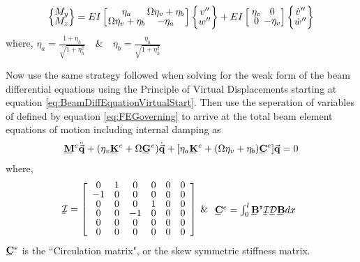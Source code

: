 \begin{equation}\label{key}
\def\cs{4em}
\def\cd{1.5em}
\left\{\def\arraystretch{.8}\begin{array}{@{}c@{}}
M_y\\
M_z
\end{array}\right\} = E I\left[\def\arraystretch{.8}\arraycolsep=0em\begin{array}{@{}cc@{}}
\makebox[\cs]{$\eta_a$}&\makebox[\cs]{$\Omega \eta_v+\eta_b$}\\
\Omega \eta_v+\eta_b&-\eta_a
\end{array}\right]\left\{\arraycolsep=0pt\def\arraystretch{.8}\begin{array}{@{}c@{}}
v''\\
w''
\end{array}\right\}+EI\left[\arraycolsep=0pt\def\arraystretch{.8}\begin{array}{@{}cc@{}}
\makebox[\cd]{$\eta_v$}&\makebox[\cd]{0}\\
0&-\eta_v
\end{array}\right]\left\{\arraycolsep=0pt\def\arraystretch{.8}\begin{array}{@{}c@{}}
\dot{v}''\\
\dot{w}''
\end{array}\right\}
\end{equation}
where, $ \eta_a=\frac{1+\eta_h}{\sqrt{1+\eta_h^2}}\quad \& \quad \eta_b=\frac{\eta_h}{\sqrt{1+\eta_h^2}} $\par 
Now use the same strategy followed when solving for the weak form of the beam differential equations using the Principle of Virtual Displacements starting at equation \eqref{eq:BeamDiffEquationVirtualStart}. Then use the seperation of variables of defined by equation \eqref{eq:FEGoverning} to arrive at the total beam element equations of motion including internal damping as
\begin{equation}\label{eq:TotalBeamFiniteElementEquationofMotion}
\bunderline{\mathbf{M}}^e\ddot{\vec{\mathbf{q}}}+(\eta_v\bunderline{\mathbf{K}}^e+\Omega\bunderline{\mathbf{G}}^e)\dot{\vec{\mathbf{q}}}+[\eta_a\bunderline{\mathbf{K}}^e+(\Omega\eta_v+\eta_b)\bunderline{\mathbf{C}}^e]\vec{\mathbf{q}}=0
\end{equation}
where,
\begin{equation}\label{key}
\bunderline{\mathcal{I}}=\left[\def\arraystretch{.8}\begin{array}{cccccc}
0&1&0&0&0&0\\
-1&0&0&0&0&0\\
0&0&0&1&0&0\\
0&0&-1&0&0&0\\
0&0&0&0&0&0\\
0&0&0&0&0&0
\end{array}\right]\:\&\:\begin{array}{c}
\bunderline{\mathbf{C}}^e=\int_0^l\bunderline{\mathbf{B}}^\T\bunderline{\mathcal{I}}\bunderline{\mathcal{D}}\bunderline{\mathbf{B}}dx
\end{array}
\end{equation}
$ \bunderline{\mathbf{C}}^e $ is the ``Circulation matrix", or the skew symmetric stiffness matrix.
